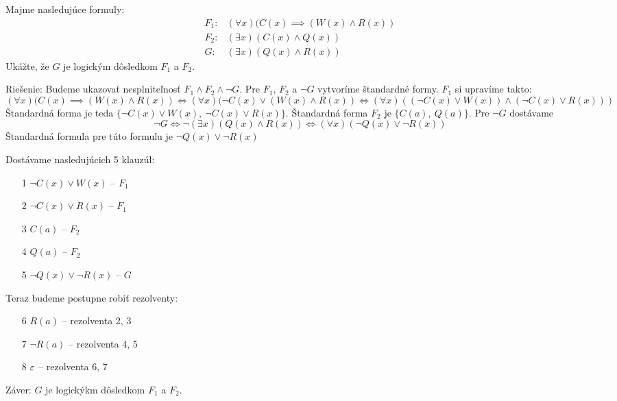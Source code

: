 \begin{priklad}
    Majme nasledujúce formuly:
    \begin{align*}
        F_1: &(\forall x) (C(x) \implies (W(x) \land R(x))\\
        F_2: &(\exists x) (C(x) \land Q(x)) \\
        G:   &(\exists x) (Q(x) \land R(x))
    \end{align*}
    Ukážte, že $G$ je logickým dôsledkom $F_1$ a $F_2$.

    Riešenie: Budeme ukazovať nesplniteľnosť $F_1 \land F_2 \land \neg G$.
    Pre $F_1$, $F_2$ a $\neg G$ vytvoríme štandardné formy.
    $F_1$ si upravíme takto:
    \begin{equation*}
        (\forall x) (C(x) \implies (W(x) \land R(x)) \iff 
        (\forall x)(\neg C(x) \lor (W(x)\land R(x)) \iff 
        (\forall x) ((\neg C(x) \lor W(x)) \land (\neg C(x) \lor R(x)))
    \end{equation*}
    Štandardná forma je teda 
    $\{\neg C(x) \lor W(x),\ \neg C(x) \lor R(x)\}$.
    Štandardná forma $F_2$ je $\{C(a),\ Q(a)\}$.
    Pre $\neg G$ dostávame
    \begin{equation*}
        \neg G \iff \neg (\exists x)(Q(x)\land R(x)) \iff 
            (\forall x) (\neg Q(x) \lor \neg R(x))
    \end{equation*}
    Štandardná formula pre túto formulu je $\neg Q(x) \lor \neg R(x)$

    Dostávame nasledujúcich 5 klauzúl:
    \begin{itemize}
        \item[1] $\neg C(x) \lor W(x)$ -- $F_1$
        \item[2] $\neg C(x) \lor R(x)$ -- $F_1$
        \item[3] $C(a)$ -- $F_2$
        \item[4] $Q(a)$ -- $F_2$
        \item[5] $\neg Q(x) \lor \neg R(x)$ -- $G$
    \end{itemize}

    Teraz budeme postupne robiť rezolventy:
    \begin{itemize}
        \item[6] $R(a)$ -- rezolventa 2, 3
        \item[7] $\neg R(a)$ -- rezolventa 4, 5
        \item[8] $\varepsilon$ -- rezolventa 6, 7
    \end{itemize}

    Záver: $G$ je logickýkm dôsledkom $F_1$ a $F_2$.
\end{priklad}


